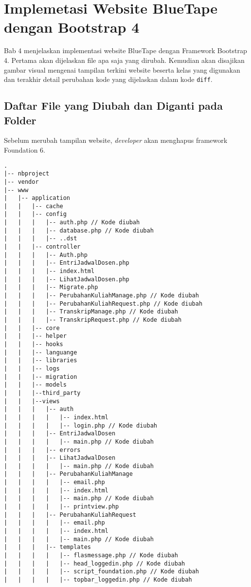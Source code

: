 \chapter{Implemetasi Website BlueTape dengan Bootstrap 4}
Bab 4 menjelaskan implementasi website BlueTape dengan Framework Bootstrap 4. Pertama akan dijelaskan file apa saja yang dirubah. Kemudian akan disajikan gambar visual mengenai tampilan terkini website beserta kelas yang digunakan dan terakhir detail perubahan kode yang dijelaskan dalam kode \texttt{diff}.
\section{Daftar File yang Diubah dan Diganti pada Folder}
Sebelum merubah tampilan website, \textit{developer} akan menghapus framework Foundation 6.  
\begin{lstlisting}[basicstyle=\ttfamily, frame=single,
columns=fullflexible, keepspaces=true, breaklines=true, label=ls:8]
.
|-- nbproject
|-- vendor
|-- www
|   |-- application
|   |   |-- cache
|   |   |-- config
|   |   |   |-- auth.php // Kode diubah
|   |   |   |-- database.php // Kode diubah
|   |   |   |-- ..dst
|   |   |-- controller
|   |   |   |-- Auth.php
|   |   |   |-- EntriJadwalDosen.php
|   |   |   |-- index.html
|   |   |   |-- LihatJadwalDosen.php
|   |   |   |-- Migrate.php
|   |   |   |-- PerubahanKuliahManage.php // Kode diubah
|   |   |   |-- PerubahanKuliahRequest.php // Kode diubah
|   |   |   |-- TranskripManage.php // Kode diubah
|   |   |   |-- TranskripRequest.php // Kode diubah
|   |   |-- core
|   |   |-- helper
|   |   |-- hooks
|   |   |-- languange
|   |   |-- libraries
|   |   |-- logs
|   |   |-- migration
|   |   |-- models
|   |   |--third_party
|   |   |--views
|   |   |   |-- auth
|   |   |   |   |-- index.html
|   |   |   |   |-- login.php // Kode diubah
|   |   |   |-- EntriJadwalDosen
|   |   |   |   |-- main.php // Kode diubah
|   |   |   |-- errors
|   |   |   |-- LihatJadwalDosen
|   |   |   |   |-- main.php // Kode diubah
|   |   |   |-- PerubahanKuliahManage
|   |   |   |   |-- email.php
|   |   |   |   |-- index.html
|   |   |   |   |-- main.php // Kode diubah
|   |   |   |   |-- printview.php
|   |   |   |-- PerubahanKuliahRequest
|   |   |   |   |-- email.php
|   |   |   |   |-- index.html
|   |   |   |   |-- main.php // Kode diubah
|   |   |   |-- templates
|   |   |   |   |-- flasmessage.php // Kode diubah
|   |   |   |   |-- head_loggedin.php // Kode diubah
|   |   |   |   |-- script_foundation.php // Kode diubah
|   |   |   |   |-- topbar_loggedin.php // Kode diubah

\end{lstlisting}
